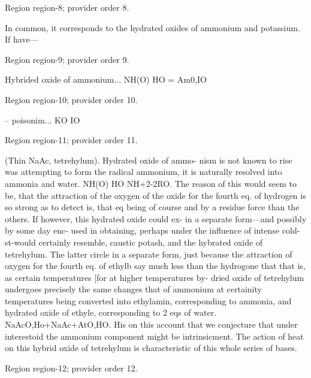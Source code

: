 \documentclass[11pt]{article}
\begin{document}
{\scriptsize\color{gray} Region region-8; provider order 8.\par}
\medskip

In common, it corresponds to the hydrated oxides of ammonium and potassium. If have—
\par

{\scriptsize\color{gray} Region region-9; provider order 9.\par}
\medskip

Hybrided oxide of ammonium... NH(O) HO = Am0,IO
\par

{\scriptsize\color{gray} Region region-10; provider order 10.\par}
\medskip

-- poisonim... KO IO
\par

{\scriptsize\color{gray} Region region-11; provider order 11.\par}
\medskip

(Thin NaAc, tetrehylum). Hydrated oxide of ammo- nism is not known to rise was attempting to form the radical ammonium, it is naturally resolved into ammonia and water. NH(O) HO NH+2-2RO. The reason of this would seem to be, that the attraction of the oxygen of the oxide for the fourth eq. of hydrogen is so strong as to detect is, that eq being of course and by a residue force than the others. If however, this hydrated oxide could ex- in a separate form—and possibly by some day enc- used in obtaining, perhaps under the influence of intense cold-st-would certainly resemble, caustic potash, and the hybrated oxide of tetrehylum. The latter circle in a separate form, just because the attraction of oxygen for the fourth eq. of ethylb say much less than the hydrogone that that is, as certain temperatures [for at higher temperatures by- dried oxide of tetrehylum undergoes precisely the same changes that of ammonium at certainity temperatures being converted into ethylamin, corresponding to ammonia, and hydrated oxide of ethyle, corresponding to 2 eqs of water. NaAcO,Ho+NaAc+AtO,HO. His on this account that we conjecture that under interestoid the ammonium component might be intrinsicment. The action of heat on this hybrid oxide of tetrehylum is characteristic of this whole series of bases.
\par

{\scriptsize\color{gray} Region region-12; provider order 12.\par}
\medskip
\end{document}

